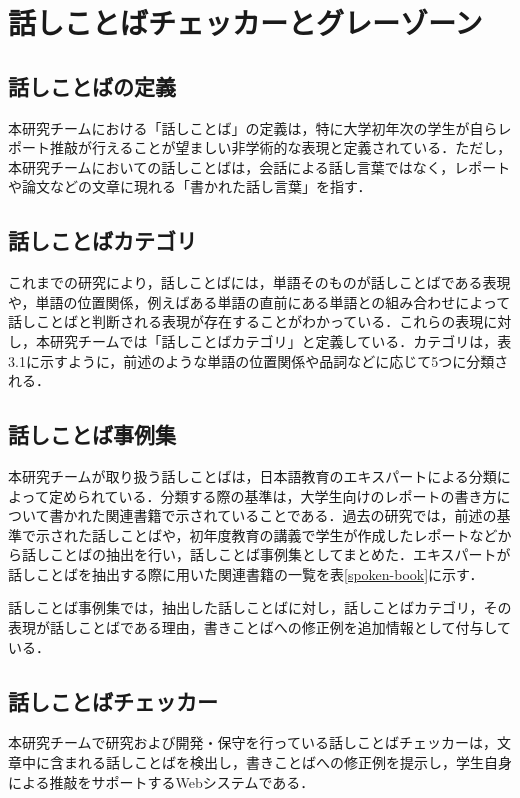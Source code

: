 \chapter{話しことばチェッカーとグレーゾーン\label{c3}}


\section{話しことばの定義 \label{c3s1}}
本研究チームにおける「話しことば」の定義は，特に大学初年次の学生が自らレポート推敲が行えることが望ましい非学術的な表現と定義されている．ただし，本研究チームにおいての話しことばは，会話による話し言葉ではなく，レポートや論文などの文章に現れる「書かれた話し言葉」を指す．

\section{話しことばカテゴリ \label{c3s2}}
これまでの研究により，話しことばには，単語そのものが話しことばである表現や，単語の位置関係，例えばある単語の直前にある単語との組み合わせによって話しことばと判断される表現が存在することがわかっている．これらの表現に対し，本研究チームでは「話しことばカテゴリ」と定義している．カテゴリは，表3.1に示すように，前述のような単語の位置関係や品詞などに応じて5つに分類される．



\section{話しことば事例集 \label{c3s3}}
本研究チームが取り扱う話しことばは，日本語教育のエキスパートによる分類によって定められている．分類する際の基準は，大学生向けのレポートの書き方について書かれた関連書籍で示されていることである．過去の研究では，前述の基準で示された話しことばや，初年度教育の講義で学生が作成したレポートなどから話しことばの抽出を行い，話しことば事例集としてまとめた．エキスパートが話しことばを抽出する際に用いた関連書籍の一覧を表\ref{spoken-book}に示す．



話しことば事例集では，抽出した話しことばに対し，話しことばカテゴリ，その表現が話しことばである理由，書きことばへの修正例を追加情報として付与している．



\section{話しことばチェッカー \label{c3s4}}
本研究チームで研究および開発・保守を行っている話しことばチェッカーは，文章中に含まれる話しことばを検出し，書きことばへの修正例を提示し，学生自身による推敲をサポートするWebシステムである．

